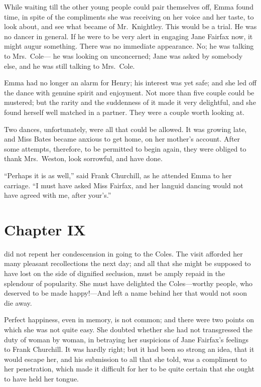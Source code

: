 While waiting till the other young people could pair themselves off,
Emma found time, in spite of the compliments she was receiving on her
voice and her taste, to look about, and see what became of Mr.\ Knightley.
This would be a trial.  He was no dancer in general.  If he were to be
very alert in engaging Jane Fairfax now, it might augur something.
There was no immediate appearance.  No; he was talking to Mrs.\ Cole---%
he was looking on unconcerned; Jane was asked by somebody else,
and he was still talking to Mrs.\ Cole.

Emma had no longer an alarm for Henry; his interest was yet safe;
and she led off the dance with genuine spirit and enjoyment.
Not more than five couple could be mustered; but the rarity and the
suddenness of it made it very delightful, and she found herself well
matched in a partner.  They were a couple worth looking at.

Two dances, unfortunately, were all that could be allowed.
It was growing late, and Miss Bates became anxious to get home,
on her mother's account.  After some attempts, therefore, to be
permitted to begin again, they were obliged to thank Mrs.\ Weston,
look sorrowful, and have done.

``Perhaps it is as well,'' said Frank Churchill, as he attended Emma
to her carriage.  ``I must have asked Miss Fairfax, and her languid
dancing would not have agreed with me, after your's.''



\chapter{Chapter IX}


 did not repent her condescension in going to the Coles.
The visit afforded her many pleasant recollections the next day;
and all that she might be supposed to have lost on the side
of dignified seclusion, must be amply repaid in the splendour
of popularity.  She must have delighted the Coles---worthy people,
who deserved to be made happy!---And left a name behind her that would
not soon die away.

Perfect happiness, even in memory, is not common; and there were
two points on which she was not quite easy.  She doubted whether
she had not transgressed the duty of woman by woman, in betraying
her suspicions of Jane Fairfax's feelings to Frank Churchill.
It was hardly right; but it had been so strong an idea, that it
would escape her, and his submission to all that she told,
was a compliment to her penetration, which made it difficult
for her to be quite certain that she ought to have held her tongue.

